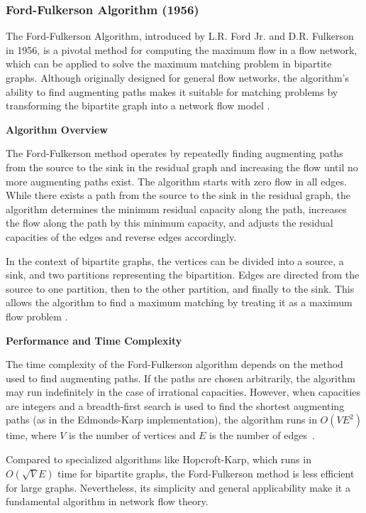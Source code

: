 
\subsubsection*{Ford-Fulkerson Algorithm (1956)}

The Ford-Fulkerson Algorithm, introduced by L.R. Ford Jr. and D.R. Fulkerson in 1956, is a pivotal method for computing the maximum flow in a flow network, which can be applied to solve the maximum matching problem in bipartite graphs. Although originally designed for general flow networks, the algorithm's ability to find augmenting paths makes it suitable for matching problems by transforming the bipartite graph into a network flow model \cite{ford_fulkerson}.

\textbf{Algorithm Overview}

The Ford-Fulkerson method operates by repeatedly finding augmenting paths from the source to the sink in the residual graph and increasing the flow until no more augmenting paths exist. The algorithm starts with zero flow in all edges. While there exists a path from the source to the sink in the residual graph, the algorithm determines the minimum residual capacity along the path, increases the flow along the path by this minimum capacity, and adjusts the residual capacities of the edges and reverse edges accordingly.

In the context of bipartite graphs, the vertices can be divided into a source, a sink, and two partitions representing the bipartition. Edges are directed from the source to one partition, then to the other partition, and finally to the sink. This allows the algorithm to find a maximum matching by treating it as a maximum flow problem \cite{cormen}.

\textbf{Performance and Time Complexity}

The time complexity of the Ford-Fulkerson algorithm depends on the method used to find augmenting paths. If the paths are chosen arbitrarily, the algorithm may run indefinitely in the case of irrational capacities. However, when capacities are integers and a breadth-first search is used to find the shortest augmenting paths (as in the Edmonds-Karp implementation), the algorithm runs in $O(V E^2)$ time, where $V$ is the number of vertices and $E$ is the number of edges~\cite{ford_fulkerson}.

Compared to specialized algorithms like Hopcroft-Karp, which runs in $O(\sqrt{V} E)$ time for bipartite graphs, the Ford-Fulkerson method is less efficient for large graphs. Nevertheless, its simplicity and general applicability make it a fundamental algorithm in network flow theory.

